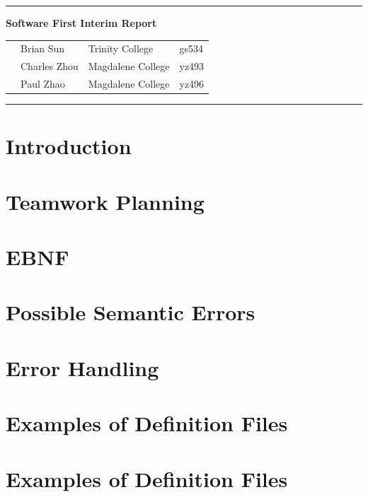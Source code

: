 \documentclass[12pt]{article}
\begin{document}
\vspace{0.3cm}
\rule{15.7cm}{0.5mm}


\begin{center}
{\hspace{0.6cm}\Large \textbf {Software First Interim Report}\\
}
\end{center}
\begin{table}[H]
\centering
\begin{tabular}{ p{1.5cm}p{5cm}p{6cm} p{6cm}} 
&Brian Sun & Trinity College & gs534 \\ 
&Charles Zhou & Magdalene College & yz493 \\ 
&Paul Zhao & Magdalene College & yz496 \\ 
\end{tabular}
\end{table}


\begin{center}
\rule{15.7cm}{0.5mm}
\end{center}

\section{Introduction}
\section{Teamwork Planning}
\section{EBNF}
\section{Possible Semantic Errors}
\section{Error Handling}
\section{Examples of Definition Files}

\section{Examples of Definition Files}
\end{document}
